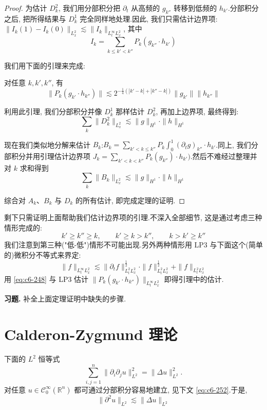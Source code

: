 \begin{proof}
为估计 $D_k^2$, 我们用分部积分把 $\partial_t$ 从高频的 $g_{k''}$ 转移到低频的 $h_{k'}$.分部积分之后, 把所得结果与 $D_k^1$ 完全同样地处理.因此, 我们只需估计边界项:$\|I_k(1) - I_k(0)\|_{L_x^2} \lesssim \|I_k\|_{L_t^\infty L_x^2}$, 其中
\[
I_k = \sum_{k \leq k' < k''} P_k (g_{k''} \cdot h_{k'})
\]

我们用下面的引理来完成:

\begin{lemma}\label{lem:c6-5.2}
对任意 $k, k', k''$, 有
\[
\|P_k (g_{k'} \cdot h_{k''})\| \lesssim 2^{-\frac{1}{4}(|k'-k| + |k''-k|)} \|g_{k'}\| \|h_{k''}\|
\]
\end{lemma}

利用此引理, 我们分部积分并像 $D_k^1$ 那样估计 $D_k^2$, 再加上边界项, 最终得到:
\[
\sum_k \|D_k^2\|_{L_x^2} \lesssim \|g\|_{H^1} \cdot \|h\|_{H^1}
\]

现在我们类似地分解来估计 $B_k$:$B_k = \sum_{k' < k \leq k''} P_k \int_0^1 (\partial_t g)_{k''} \cdot h_{k'}$.同上, 我们分部积分并用引理估计边界项 $J_k = \sum_{k' < k < k''} P_k (g_{k''}) \cdot h_{k'})$.然后不难经过整理并对 $k$ 求和得到
\[
\sum_k \|B_k\|_{L_x^2} \lesssim \|g\|_{H^1} \cdot \|h\|_{H^1}
\]

综合对 $A_k$、$B_k$ 与 $D_k$ 的所有估计, 即完成定理的证明.
\end{proof}

剩下只需证明上面帮助我们估计边界项的引理.不深入全部细节, 这是通过考虑三种情形完成的:
\[
k' \geq k'' \geq k, \qquad k' \geq k > k'', \qquad k > k' \geq k''
\]
我们注意到第三种("低-低")情形不可能出现.另外两种情形用 LP3 与下面这个(简单的)微积分不等式来界定:
\begin{equation}
\|f\|_{L_t^\infty L_x^2} \lesssim \|\partial_t f\|_{L_t^2 L_x^2}^{\frac{1}{2}} \cdot \|f\|_{L_t^2 L_x^2}^{\frac{1}{2}} + \|f\|_{L_t^2 L_x^2}\label{eq:c6-248}
\end{equation}
用 \eqref{eq:c6-248} 与 LP3 估计 $\|P_k(g_{k'} \cdot h_{k''})\|_{L_t^\infty L_x^2}$ 即得引理中的估计.

\textbf{习题.} 补全上面定理证明中缺失的步骤.

\section{Calderon-Zygmund 理论}

下面的 $L^2$ 恒等式
\[
\sum_{i, j=1}^n \|\partial_i \partial_j u\|^2_{L^2} = \|\Delta u\|^2_{L^2}.
\]
对任意 $u \in \mathcal{C}_0^\infty(\mathbb{R}^n)$ 都可通过分部积分容易地建立, 见下文 \eqref{eq:c6-252}.于是,
\begin{equation}
\|\partial^2 u\|_{L^2} \lesssim \|\Delta u\|_{L^2}\label{eq:c6-249}
\end{equation}

